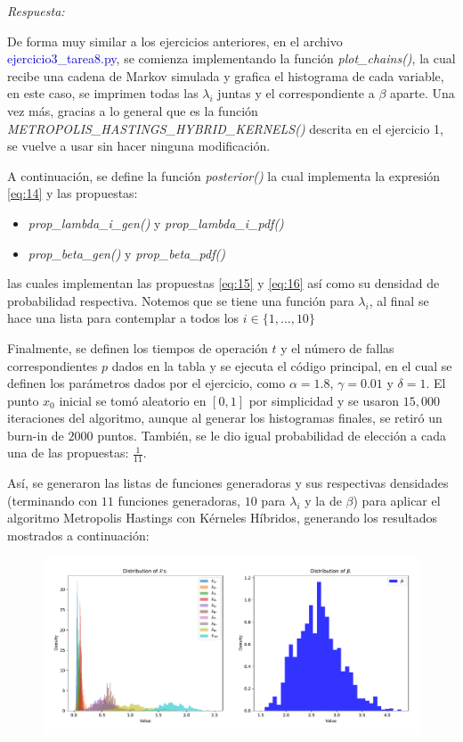 \textcolor{BrickRed}{\it Respuesta:}

De forma muy similar a los ejercicios anteriores, en el archivo \textcolor{mediumblue}{ejercicio3\_tarea8.py}, se comienza implementando la función \textit{plot\_chains()}, la cual recibe una cadena de Markov simulada y grafica el histograma de cada variable, en este caso, se imprimen todas las $\lambda_i$ juntas y el correspondiente a $\beta$ aparte. Una vez más, gracias a lo general que es la función \textit{METROPOLIS\_HASTINGS\_HYBRID\_KERNELS()} descrita en el ejercicio 1, se vuelve a usar sin hacer ninguna modificación.

A continuación, se define la función \textit{posterior()} la cual implementa la expresión \eqref{eq:14} y las propuestas:
\begin{itemize}
	\item \textit{prop\_lambda\_i\_gen()}  y \textit{prop\_lambda\_i\_pdf()}
	\item \textit{prop\_beta\_gen()} y \textit{prop\_beta\_pdf()}
\end{itemize}
las cuales implementan las propuestas \eqref{eq:15} y \eqref{eq:16} así como su densidad de probabilidad respectiva. Notemos que se tiene una función para $\lambda_i$, al final se hace una lista para contemplar a todos los $i\in\{1,\dots,10\}$

Finalmente, se definen los tiempos de operación $t$ y el número de fallas correspondientes $p$ dados en la tabla y se ejecuta el código principal, en el cual se definen los parámetros dados por el ejercicio, como $\alpha=1.8$, $\gamma=0.01$ y $\delta=1$. El punto $x_0$ inicial se tomó aleatorio en $[0,1]$ por simplicidad y se usaron $15,000$ iteraciones del algoritmo, aunque al generar los histogramas finales, se retiró un burn-in de $2000$ puntos. También, se le dio igual probabilidad de elección a cada una de las propuestas: $\frac{1}{11}$. 

Así, se generaron las listas de funciones generadoras y sus respectivas densidades (terminando con $11$ funciones generadoras, $10$ para $\lambda_i$ y la de $\beta$) para aplicar el algoritmo Metropolis Hastings con Kérneles Híbridos, generando los resultados mostrados a continuación:

\begin{figure}[h!]
	\centering
	\includegraphics[width=\textwidth]{IMAGENES/exercise3.pdf}
\end{figure}

